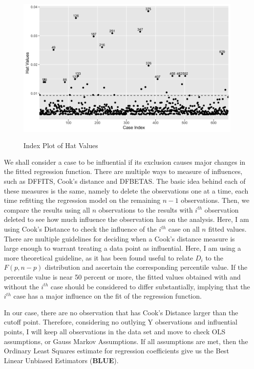 \documentclass{article}
\begin{document}
\begin{figure}[htbp]
\begin{center}
\caption{Index Plot of Hat Values}
\includegraphics[scale=0.32]{leverage_points.png}
\label{fig: 11}
\end{center}
\end{figure}

We shall consider a case to be influential if its exclusion causes major changes in the fitted regression function. There are multiple ways to measure of influences, such as DFFITS, Cook's distance and DFBETAS. The basic idea behind each of these measures is the same, namely to delete the observations one at a time, each time refitting the regression model on the remaining $n-1$ observations. Then, we compare the results using all $n$ observations to the results with $i^{th}$ observation deleted to see how much influence the observation has on the analysis. Here, I am using Cook's Distance to check the influence of the $i^{th}$ case on all $n$ fitted values. There are multiple guidelines for deciding when a Cook's distance measure is large enough to warrant treating a data point as influential. Here, I am using a more theoretical guideline, as it has been found useful to relate $D_{i}$ to the $F(p, n-p)$ distribution and ascertain the corresponding percentile value. If the percentile value is near 50 percent or more, the fitted values obtained with and without the $i^{th}$ case should be considered to differ substantially, implying that the $i^{th}$ case has a major influence on the fit of the regression function.

In our case, there are no observation that has Cook's Distance larger than the cutoff point. Therefore, considering no outlying Y observations and influential points, I will keep all observations in the data set and move to check OLS assumptions, or Gauss Markov Assumptions. If all assumptions are met, then the Ordinary Least Squares estimate for regression coefficients give us the Best Linear Unbiased Estimators (\textbf{BLUE}). 
\end{document}
